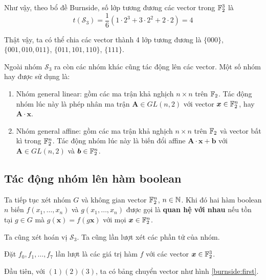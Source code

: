 Như vậy, theo bổ đề Burnside, số lớp tương đương các vector trong $\mathbb{F}_2^3$ là \[ t(\mathcal{S}_3) = \frac{1}{6} (1 \cdot 2^3 + 3 \cdot 2^2 + 2 \cdot 2) = 4 \]

Thật vậy, ta có thể chia các vector thành 4 lớp tương đương là $\{ 000 \}$, $\{ 001, 010, 011 \}$, $\{ 011, 101, 110 \}$, $\{ 111 \}$.

Ngoài nhóm $\mathcal{S}_3$ ra còn các nhóm khác cũng tác động lên các vector. Một số nhóm hay được sử dụng là:

\begin{enumerate}
    \item Nhóm general linear: gồm các ma trận khả nghịch $n \times n$ trên $\mathbb{F}_2$. Tác động nhóm lúc này là phép nhân ma trận $\bm{A} \in GL(n, 2)$ với vector $\bm{x} \in \mathbb{F}_2^n$, hay $\bm{A} \cdot \bm{x}$.
    \item Nhóm general affine: gồm các ma trận khả nghịch $n \times n$ trên $\mathbb{F}_2$ và vector bất kì trong $\mathbb{F}_2^n$. Tác động nhóm lúc này là biến đổi affine $\bm{A} \cdot \bm{x} + \bm{b}$ với $\bm{A} \in GL(n, 2)$ và $\bm{b} \in \mathbb{F}_2^n$.
\end{enumerate}



\subsection*{Tác động nhóm lên hàm boolean}

Ta tiếp tục xét nhóm $G$ và không gian vector $\mathbb{F}_2^n$, $n \in \mathbb{N}$. Khi đó hai hàm boolean $n$ biến $f(x_1, \ldots, x_n)$ và $g(x_1, \ldots, x_n)$ được gọi là \textbf{quan hệ với nhau} nếu tồn tại $g \in G$ mà $g(\bm{x}) = f(g \bm{x})$ với mọi $\bm{x} \in \mathbb{F}_2^n$.

Ta cũng xét hoán vị $\mathcal{S}_3$. Ta cũng lần lượt xét các phần tử của nhóm.

Đặt $f_0, f_1, \ldots, f_7$ lần lượt là các giá trị hàm $f$ với các vector $\bm{x} \in \mathbb{F}_2^3$.

Đầu tiên, với $(1)(2)(3)$, ta có bảng chuyển vector như hình \ref{burnside:first}.

